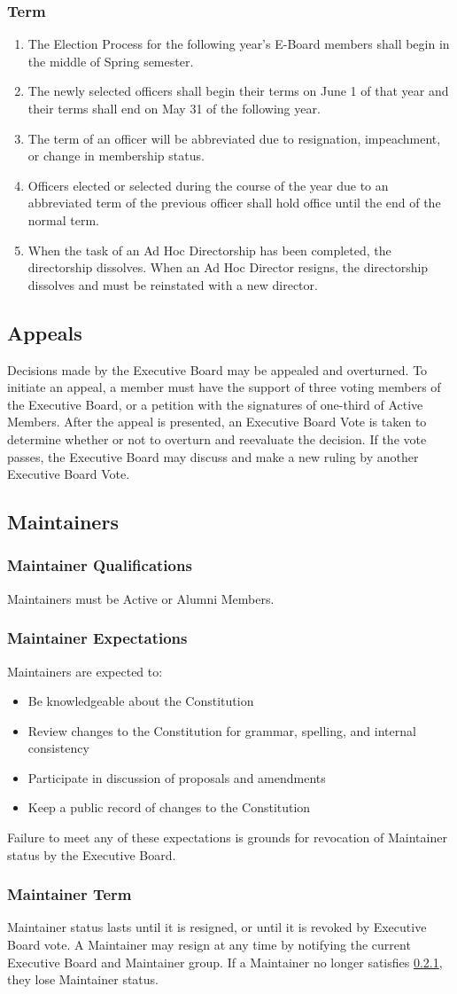 \documentclass{article}
\newcommand{\asection}[1]{\subsection{#1} \label{#1}}
\newcommand{\asubsection}[1]{\subsubsection{#1} \label{#1}}
\begin{document}
\asubsection{Term}
\begin{enumerate}
\item The Election Process for the following year's E-Board members shall begin in the middle of Spring semester.
\item The newly selected officers shall begin their terms on June 1 of that year and their terms shall end on May 31 of the following year.
\item The term of an officer will be abbreviated due to resignation, impeachment, or change in membership status.
\item Officers elected or selected during the course of the year due to an abbreviated term of the previous officer shall hold office until the end of the normal term.
\item When the task of an Ad Hoc Directorship has been completed, the directorship dissolves.
	When an Ad Hoc Director resigns, the directorship dissolves and must be reinstated with a new director.
\end{enumerate}

\asection{Appeals}
Decisions made by the Executive Board may be appealed and overturned.
To initiate an appeal, a member must have the support of three voting members of the Executive Board, or a petition with the signatures of one-third of Active Members.
After the appeal is presented, an Executive Board Vote is taken to determine whether or not to overturn and reevaluate the decision.
If the vote passes, the Executive Board may discuss and make a new ruling by another Executive Board Vote.

\asection{Maintainers}

\asubsection{Maintainer Qualifications}
Maintainers must be Active or Alumni Members.

\asubsection{Maintainer Expectations}
Maintainers are expected to:
\begin{itemize}
	\item Be knowledgeable about the Constitution
	\item Review changes to the Constitution for grammar, spelling, and internal consistency
	\item Participate in discussion of proposals and amendments
	\item Keep a public record of changes to the Constitution
\end{itemize}
Failure to meet any of these expectations is grounds for revocation of Maintainer status by the Executive Board.

\asubsection{Maintainer Term}
Maintainer status lasts until it is resigned, or until it is revoked by Executive Board vote.
A Maintainer may resign at any time by notifying the current Executive Board and Maintainer group.
If a Maintainer no longer satisfies \ref{Maintainer Qualifications}, they lose Maintainer status.
\end{document}
